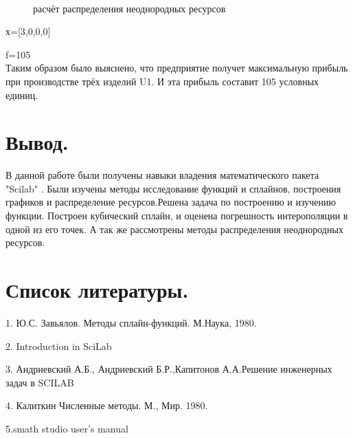 \documentclass[russian,utf8,nocolumnxxxi,nocolumnxxxii]{eskdtext}
\begin{document}
\begin{figure}[H]
 \\
\caption{расчёт распределения неоднородных ресурсов}
\end{figure}


х=[3,0,0,0] 


f=105\\

Таким образом было выяснено, что предприятие получет максимальную прибыль при производстве трёх изделий U1.  И эта прибыль составит 105 условных единиц.

\newpage

\section{Вывод.}

В данной работе были получены навыки владения математического пакета  "Scilab" . Были изучены методы исследование функций и сплайнов, построения графиков и распределение ресурсов.Решена задача по построению и изучению функции. Построен кубический сплайн, и оценена погрешность интерополяции в одной из его точек. А так же рассмотрены методы распределения неоднородных ресурсов.




\newpage
\section{Список литературы.}

1. Ю.С. Завьялов. Методы сплайн-функций. М.Наука, 1980.

2. Introduction in SciLab

3. Андриевский А.Б., Андриевский Б.Р.,Капитонов А.А.Решение инженерных задач в SCILAB

4. Калиткин Численные методы. М., Мир. 1980.

5.smath studio user’s manual
\end{document}

